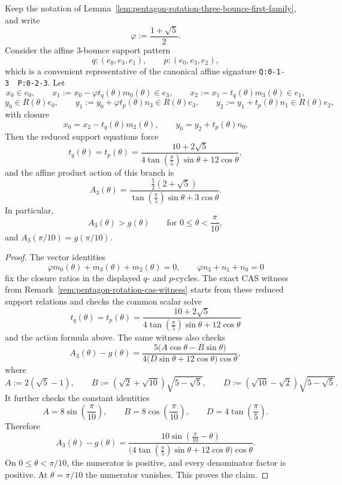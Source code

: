 \begin{unverified}
\begin{lemma}
\label{lem:pentagon-rotation-three-bounce-third-family}
Keep the notation of
Lemma~\ref{lem:pentagon-rotation-three-bounce-first-family}, and write
\[
  \varphi := \frac{1+\sqrt{5}}{2}.
\]
Consider the affine 3-bounce support pattern
\[
  q : (e_0,e_3,e_1),
  \qquad
  p : (e_0,e_3,e_2),
\]
which is a convenient representative of the canonical affine signature
\texttt{Q:0-1-3\ \ P:0-2-3}. Let
\[
  x_0 \in e_0,
  \qquad
  x_1 := x_0 - \varphi t_q(\theta)m_0(\theta) \in e_3,
  \qquad
  x_2 := x_1 - t_q(\theta)m_3(\theta) \in e_1,
\]
\[
  y_0 \in R(\theta)e_0,
  \qquad
  y_1 := y_0 + \varphi t_p(\theta)n_3 \in R(\theta)e_3,
  \qquad
  y_2 := y_1 + t_p(\theta)n_1 \in R(\theta)e_2,
\]
with closure
\[
  x_0 = x_2 - t_q(\theta)m_2(\theta),
  \qquad
  y_0 = y_2 + t_p(\theta)n_0.
\]
Then the reduced support equations force
\[
  t_q(\theta) = t_p(\theta)
  =
  \frac{10+2\sqrt{5}}{4\tan\left(\frac{\pi}{5}\right)\sin\theta + 12\cos\theta},
\]
and the affine product action of this branch is
\[
  A_3(\theta)
  =
  \frac{
    \frac{5}{2}\left(2+\sqrt{5}\right)
  }
  {
    \tan\left(\frac{\pi}{5}\right)\sin\theta + 3\cos\theta
  }.
\]
In particular,
\[
  A_3(\theta) > g(\theta)
  \qquad
  \text{for } 0 \le \theta < \frac{\pi}{10},
\]
and $A_3(\pi/10)=g(\pi/10)$.
\end{lemma}

\begin{proof}
The vector identities
\[
  \varphi m_0(\theta) + m_3(\theta) + m_2(\theta) = 0,
  \qquad
  \varphi n_3 + n_1 + n_0 = 0
\]
fix the closure ratios in the displayed $q$- and $p$-cycles. The exact CAS
witness from Remark~\ref{rem:pentagon-rotation-cas-witness} starts from these
reduced support relations and checks the common scalar solve
\[
  t_q(\theta) = t_p(\theta)
  =
  \frac{10+2\sqrt{5}}{4\tan\left(\frac{\pi}{5}\right)\sin\theta + 12\cos\theta}
\]
and the action formula above. The same witness also checks
\[
  A_3(\theta) - g(\theta)
  =
  \frac{
    5\bigl(A\cos\theta - B\sin\theta\bigr)
  }
  {
    4\bigl(D\sin\theta + 12\cos\theta\bigr)\cos\theta
  },
\]
where
\[
  A := 2(\sqrt{5}-1),
  \qquad
  B := (\sqrt{2}+\sqrt{10})\sqrt{5-\sqrt{5}},
  \qquad
  D := (\sqrt{10}-\sqrt{2})\sqrt{5-\sqrt{5}}.
\]
It further checks the constant identities
\[
  A = 8\sin\left(\frac{\pi}{10}\right),
  \qquad
  B = 8\cos\left(\frac{\pi}{10}\right),
  \qquad
  D = 4\tan\left(\frac{\pi}{5}\right).
\]
Therefore
\[
  A_3(\theta) - g(\theta)
  =
  \frac{
    10\sin\left(\frac{\pi}{10}-\theta\right)
  }
  {
    \bigl(4\tan\left(\frac{\pi}{5}\right)\sin\theta + 12\cos\theta\bigr)\cos\theta
  }.
\]
On $0 \le \theta < \pi/10$, the numerator is positive, and every denominator
factor is positive. At $\theta=\pi/10$ the numerator vanishes. This proves the
claim.
\end{proof}
\end{unverified}

